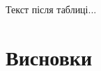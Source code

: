 \documentclass[10pt,a5paper,titlepage,oneside]{book}
\numberwithin{equation}{part}
\renewcommand{\theequation}{\thechapter.\arabic{equation}}
\begin{document}
Текст після таблиці...




\chapter*{Висновки}






%



\vspace{-5cm}
\setcounter{page}{3}







\end{document}
